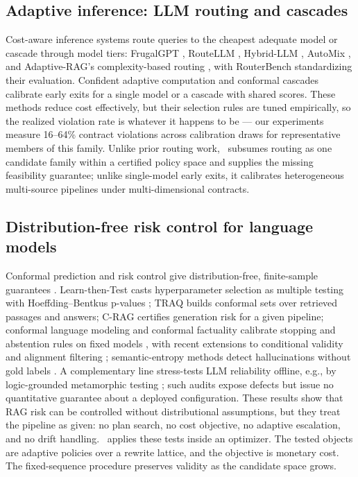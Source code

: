 \subsection{Adaptive inference: LLM routing and cascades}
Cost-aware inference systems route queries to the cheapest adequate
model or cascade through model tiers: FrugalGPT \citep{chen2023frugalgpt},
RouteLLM \citep{ong2024routellm}, Hybrid-LLM \citep{ding2024hybridllm},
AutoMix \citep{aggarwal2024automix}, and Adaptive-RAG's
complexity-based
routing \citep{jeong2024adaptiverag}, with RouterBench
\citep{hu2024routerbench} standardizing their evaluation. Confident
adaptive computation
\citep{schuster2022calm} and conformal cascades \citep{fisch2021admission}
calibrate early exits for a single model or a cascade with shared
scores. These methods reduce cost effectively, but their selection
rules are tuned empirically, so the realized violation rate is whatever
it happens to be --- our experiments measure 16--64\% contract
violations across calibration draws for representative members of this
family. Unlike prior routing work, \system\ subsumes routing as one
candidate family within a certified policy space and supplies the
missing feasibility guarantee; unlike single-model early exits, it
calibrates heterogeneous multi-source pipelines under
multi-dimensional contracts.

\subsection{Distribution-free risk control for language models}
Conformal prediction and risk control give distribution-free,
finite-sample guarantees
\citep{vovk2005algorithmic,angelopoulos2024crc}.
Learn-then-Test \citep{angelopoulos2021ltt} casts hyperparameter
selection as multiple testing with Hoeffding--Bentkus p-values
\citep{bentkus2004hoeffding}; TRAQ \citep{li2024traq} builds conformal
sets over retrieved passages and answers; C-RAG \citep{kang2024crag}
certifies generation risk for a given pipeline; conformal language
modeling and conformal factuality calibrate stopping and abstention
rules on fixed models
\citep{quach2024conformallm,mohri2024factuality}, with recent
extensions to conditional validity and alignment filtering
\citep{cherian2024validity,gui2024conformalalign}; semantic-entropy
methods detect hallucinations without gold labels
\citep{farquhar2024semantic}. A complementary line stress-tests LLM
reliability offline, e.g., by logic-grounded metamorphic testing
\citep{zhou2026lgmt}; such audits expose defects but issue no
quantitative guarantee about a deployed configuration. These results
show that RAG risk can be controlled without distributional assumptions,
but they
treat the pipeline as given: no plan search, no cost objective, no
adaptive escalation, and no drift handling. \system\ applies these tests
inside an optimizer. The tested objects are adaptive policies over a
rewrite lattice, and the objective is monetary cost. The fixed-sequence
procedure preserves validity as the candidate space grows.

